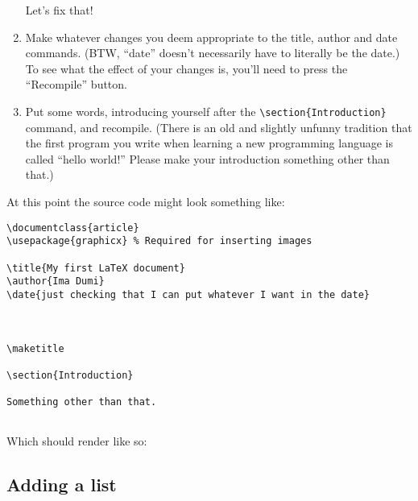 \begin{enumerate}
Let's fix that!


\item Make whatever changes you deem appropriate to the title, author and date commands. (BTW, ``date'' doesn't necessarily have to literally be the date.)  To see what the effect of your changes is, you'll need to press the ``Recompile'' button.

\item Put some words, introducing yourself after the \verb+\section{Introduction}+ command, and recompile. (There is an old and slightly unfunny tradition that the first program you write when learning a new programming language is called ``hello world!''  Please make your introduction something other than that.)

\end{enumerate}

At this point the source code might look something like:
\bigskip

\begin{codeblock}
\begin{verbatim}
\documentclass{article}
\usepackage{graphicx} % Required for inserting images

\title{My first LaTeX document}
\author{Ima Dumi}
\date{just checking that I can put whatever I want in the date}



\maketitle

\section{Introduction}

Something other than that.


\end{verbatim}
\end{codeblock}

\clearpage

Which should render like so:


\begin{center}
\end{center}


\subsection*{Adding a list}

